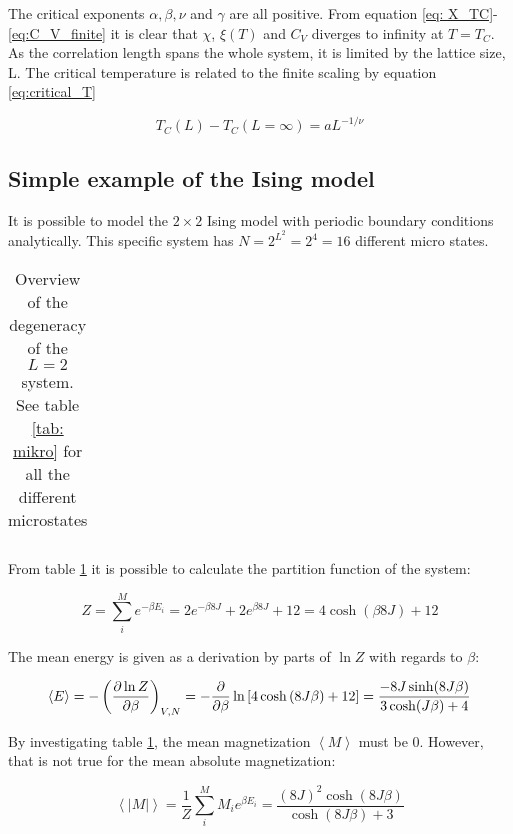 The critical exponents $ \alpha, \beta, \nu $ and $ \gamma $ are all positive. From equation \ref{eq: X_TC}-\ref{eq:C_V_finite} it is clear that $\chi$,  $\xi (T)$ and $ C_V $  diverges to infinity at $ T = T_C $. As the correlation length spans the whole system, it is limited by the lattice size, L. The critical temperature is related to the finite scaling by equation \ref{eq:critical_T}

\begin{equation}\label{eq:critical_T}
	T_C(L) - T_C(L=\infty) = a L^{-1/\nu}
\end{equation}




\subsection{Simple example of the Ising model}

It is possible to model the $ 2\times 2 $ Ising model with periodic boundary conditions analytically. This specific system has $ N = 2^{L^2} = 2^4=16 $ different micro states. 


\begin{table}[H]
	\caption{Overview  of the degeneracy of the $ L=2 $ system. See table \ref{tab: mikro} for all the different microstates}
	\label{tab: makro}
	\begin{tabular}{cccccc}
		
	\end{tabular}
\end{table}

From table \ref{tab: makro} it is possible to calculate the partition function of the system: 

\[
Z = \sum_i^M e^{-\beta E_i} = 2e^{-\beta 8 J}  + 2e^{\beta 8 J} + 12 = 4 \cosh\left( \beta 8 J \right) + 12
\]

The mean energy is given as a derivation by parts of $ \ln Z $ with regards to $ \beta $:

\[ 	\langle E \rangle = - \left(\pdv{\ln Z}{\beta}\right)_{V,N} = 	 - \frac{\partial}{\partial \beta} \ln \left[ 4 \cosh \left( 8J\beta\right)+12\right] =\frac{-8J \sinh(8J\beta)}{3\cosh(J\beta)+ 4} \]  

By investigating table \ref{tab: makro}, the mean magnetization 
$
\left< M \right> $ must be $0$. However, that is not true for the mean absolute magnetization:

\[
\left< |M| \right> = \frac{1}{Z} \sum_i^M M_i e^{\beta E_i}  = \frac{(8J)^2 \cosh(8J\beta )}{\cosh (8J\beta ) + 3}
\]


